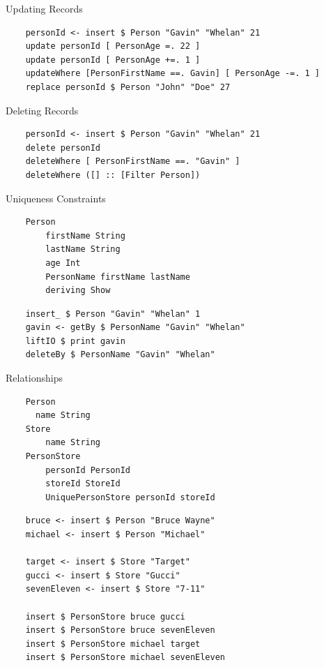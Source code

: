 \documentclass[pdf]{beamer}
\begin{document}
\begin{frame}[fragile]{Updating Records}
  \begin{verbatim}
    personId <- insert $ Person "Gavin" "Whelan" 21
    update personId [ PersonAge =. 22 ]
    update personId [ PersonAge +=. 1 ]
    updateWhere [PersonFirstName ==. Gavin] [ PersonAge -=. 1 ]
    replace personId $ Person "John" "Doe" 27
  \end{verbatim}
\end{frame}

\begin{frame}[fragile]{Deleting Records}
  \begin{verbatim}
    personId <- insert $ Person "Gavin" "Whelan" 21
    delete personId
    deleteWhere [ PersonFirstName ==. "Gavin" ]
    deleteWhere ([] :: [Filter Person])
  \end{verbatim}
\end{frame}

\begin{frame}[fragile]{Uniqueness Constraints}
  \begin{verbatim}
    Person
        firstName String
        lastName String
        age Int
        PersonName firstName lastName
        deriving Show
  \end{verbatim}
  \pause
  \begin{verbatim}
    insert_ $ Person "Gavin" "Whelan" 1
    gavin <- getBy $ PersonName "Gavin" "Whelan"
    liftIO $ print gavin
    deleteBy $ PersonName "Gavin" "Whelan"
  \end{verbatim}
\end{frame}

\begin{frame}[fragile]{Relationships}
  \begin{verbatim}
    Person
      name String
    Store
        name String
    PersonStore
        personId PersonId
        storeId StoreId
        UniquePersonStore personId storeId
  \end{verbatim}
  \pause
  \begin{verbatim}
    bruce <- insert $ Person "Bruce Wayne"
    michael <- insert $ Person "Michael"

    target <- insert $ Store "Target"
    gucci <- insert $ Store "Gucci"
    sevenEleven <- insert $ Store "7-11"

    insert $ PersonStore bruce gucci
    insert $ PersonStore bruce sevenEleven
    insert $ PersonStore michael target
    insert $ PersonStore michael sevenEleven
  \end{verbatim}
\end{frame}
\end{document}
